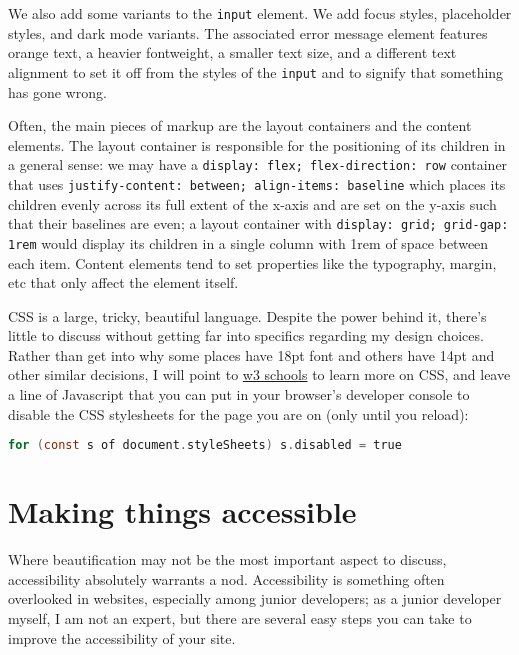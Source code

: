 \documentclass[11pt, twoside, reqno]{book}
\begin{document}
We also add some variants to the \texttt{input} element. We add focus styles, placeholder styles, and dark mode variants. The associated error message element features orange text, a heavier fontweight, a smaller text size, and a different text alignment to set it off from the styles of the \texttt{input} and to signify that something has gone wrong.

Often, the main pieces of markup are the layout containers and the content elements. The layout container is responsible for the positioning of its children in a general sense: we may have a \texttt{display: flex; flex-direction: row} container that uses \texttt{justify-content: between; align-items: baseline} which places its children evenly across its full extent of the x-axis and are set on the y-axis such that their baselines are even; a layout container with \texttt{display: grid; grid-gap: 1rem} would display its children in a single column with 1rem of space between each item. Content elements tend to set properties like the typography, margin, etc that only affect the element itself.

CSS is a large, tricky, beautiful language. Despite the power behind it, there's little to discuss without getting far into specifics regarding my design choices. Rather than get into why some places have 18pt font and others have 14pt and other similar decisions, I will point to \href{https://www.w3schools.com/css/default.asp}{w3 schools} to learn more on CSS, and leave a line of Javascript that you can put in your browser's developer console to disable the CSS stylesheets for the page you are on (only until you reload):
\begin{lstlisting}[language=C]
for (const s of document.styleSheets) s.disabled = true
\end{lstlisting}

\section{Making things accessible}

Where beautification may not be the most important aspect to discuss, accessibility absolutely warrants a nod. Accessibility is something often overlooked in websites, especially among junior developers; as a junior developer myself, I am not an expert, but there are several easy steps you can take to improve the accessibility of your site.
\end{document}
